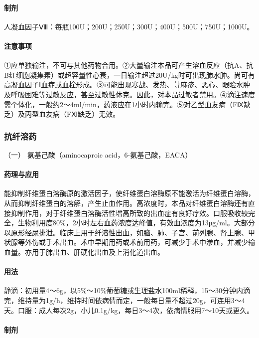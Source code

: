 \paragraph{制剂}

人凝血因子Ⅷ：每瓶100U；200U；250U；300U；400U；500U；750U；1000U。

\paragraph{注意事项}

①应单独输注，不可与其他药物合用。②大量输注本品可产生溶血反应（抗A、抗B红细胞凝集素）或超容量性心衰，一日输注超过20U/kg时可出现肺水肿。尚可有高凝血因子Ⅰ血症或血栓形成。③可能出现寒战、发热、荨麻疹、恶心、眼睑水肿及呼吸困难等过敏反应，甚至过敏性休克。因此，对本品过敏者禁用。④滴注速度需个体化，一般约2～4ml/min，药液应在1小时内输完。⑤对乙型血友病（FⅨ缺乏）及丙型血友病（FⅪ缺乏）无效。

\subsubsection{抗纤溶药}

\hypertarget{text00438.htmlux5cux23CHP17-8-2-1}{}
（一） 氨基己酸（aminocaproic acid，6-氨基己酸，EACA）

\paragraph{药理与应用}

能抑制纤维蛋白溶酶原的激活因子，使纤维蛋白溶酶原不能激活为纤维蛋白溶酶，从而抑制纤维蛋白的溶解，产生止血作用。高浓度时，本品对纤维蛋白溶酶还有直接抑制作用，对于纤维蛋白溶酶活性增高所致的出血症有良好疗效。口服吸收较完全，生物利用度80\%，2小时左右血药浓度达峰值，有效血浓度为13μg/ml。大部分以原形经尿排泄。临床上用于纤溶性出血，如脑、肺、子宫、前列腺、肾上腺、甲状腺等外伤或手术出血。术中早期用药或术前用药，可减少手术中渗血，并减少输血量。亦用于肺出血、肝硬化出血及上消化道出血。

\paragraph{用法}

静滴：初用量4～6g，以5\%～10\%葡萄糖或生理盐水100ml稀释，15～30分钟内滴完，维持量为1g/h，维持时间依病情而定，一般每日量不超过20g，可连用3～4天。口服：成人每次2g，小儿0.1g/kg，每日3～4次，依病情服用7～10天或更久。

\paragraph{制剂}

